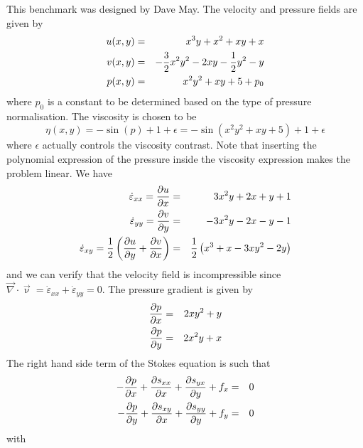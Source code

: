 This benchmark was designed by Dave May. 
The velocity and pressure fields are given by
\begin{eqnarray}
u(x,y) &=& x^3 y + x^2 + xy + x \nonumber\\
v(x,y) &=& -\frac{3}{2}x^2y^2 - 2xy - \frac{1}{2}y^2 - y \nonumber\\
p(x,y) &=& x^2y^2 + xy + 5 + p_0
\end{eqnarray}
where $p_0$ is a constant to be determined based on the type of pressure normalisation.
The viscosity is chosen to be
\begin{equation}
\eta(x,y)=-\sin(p)+1+\epsilon = -\sin (x^2y^2 + xy + 5) + 1 + \epsilon 
\end{equation}
where $\epsilon$ actually controls the viscosity contrast. Note that inserting the polynomial 
expression of the pressure inside the viscosity expression makes the problem linear. 
We have
\begin{eqnarray}
\dot{\varepsilon}_{xx} = \frac{\partial u}{\partial x} &=& 3x^2y+2x+y+1 \nonumber\\
\dot{\varepsilon}_{yy} = \frac{\partial v}{\partial y} &=& -3x^2y-2x-y-1 \nonumber\\
\dot{\varepsilon}_{xy} = \frac{1}{2}\left(\frac{\partial u}{\partial y} + \frac{\partial v}{\partial x} \right)
&=& \frac{1}{2}\left(x^3+x-3xy^2-2y \right)
\end{eqnarray}
and we can verify that the velocity field is incompressible since ${\vec \nabla}\cdot{\vec \upnu} = 
\dot{\varepsilon}_{xx} + \dot{\varepsilon}_{yy} =0$.
The pressure gradient is given by
\begin{eqnarray}
\frac{\partial p}{\partial x} &=& 2xy^2+y \nonumber\\
\frac{\partial p}{\partial y} &=& 2x^2y+x \nonumber
\end{eqnarray}
The right hand side term of the Stokes equation is such that
\begin{eqnarray}
 - \frac{\partial p}{\partial x} + \frac{\partial s_{xx}}{\partial x} + \frac{\partial s_{yx}}{\partial y} +f_x&=&0\nonumber\\
 - \frac{\partial p}{\partial y} + \frac{\partial s_{xy}}{\partial x} + \frac{\partial s_{yy}}{\partial y} +f_y&=&0
\end{eqnarray}
with 
